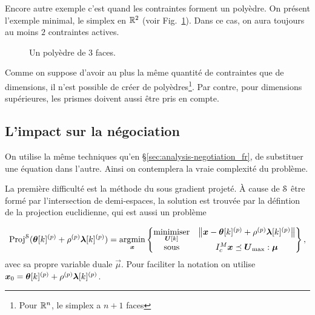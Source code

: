 \documentclass[../main.tex]{subfiles}
\begin{document}
Encore autre exemple c'est quand les contraintes forment un polyèdre.
On présent l'exemple minimal, le simplex en $\mathbb{R}^{2}$ (voir Fig.~\ref{fig:triangle_inequality_fr}).
Dans ce cas, on aura toujours au moins $2$ contraintes actives.
\begin{figure}[h]
  \centering
  \caption{Un polyèdre de $3$ faces.}\label{fig:triangle_inequality_fr}
\end{figure}

Comme on suppose d'avoir au plus la même quantité de contraintes que de dimensions, il n'est possible de créer de polyèdres\footnote{Pour $\mathbb{R}^{n}$, le simplex a $n+1$ faces}. Par contre, pour dimensions supérieures, les prismes doivent aussi être pris en compte.

\subsection{L'impact sur la négociation}\label{sec:impact-local-problem_fr}
On utilise la même techniques qu'en \S\ref{sec:analysis-negotiation_fr}, de substituer une équation dans l'autre.
Ainsi on contemplera la vraie complexité du problème.

La première difficulté est la méthode du sous gradient projeté.
À cause de $\mathcal{S}$ être formé par l'intersection de demi-espaces, la solution est trouvée par la défintion de la projection euclidienne, qui est aussi un problème \qp{}

\begin{equation}
  \label{eq:projected_subgradient_qp}
  \operatorname{Proj}^{\mathcal{S}}(\boldsymbol{\theta}[k]^{(p)}+\rho^{(p)}\boldsymbol{\lambda}[k]^{(p)})=
  \mathop{\arg\!\min}\limits_{\boldsymbol{x}}
  \left\{
    \begin{matrix}
      \mathop{\textrm{minimiser}}\limits_{\boldsymbol{U}[k]} &
                                      \left\lVert\boldsymbol{x}-\boldsymbol{\theta}[k]^{(p)}+\rho^{(p)}\boldsymbol{\lambda}[k]^{(p)}\right\rVert\\
      \mathrm{sous} & I_{c}^{M}\boldsymbol{x}\preceq \boldsymbol{U}_{\max}:\boldsymbol{\mu}\\
    \end{matrix}
  \right\},
\end{equation}
avec sa propre variable duale $\vec{\mu}$.
Pour faciliter la notation on utilise $\boldsymbol{x}_{0}=\boldsymbol{\theta}[k]^{(p)}+\rho^{(p)}\boldsymbol{\lambda}[k]^{(p)}$.
\end{document}
